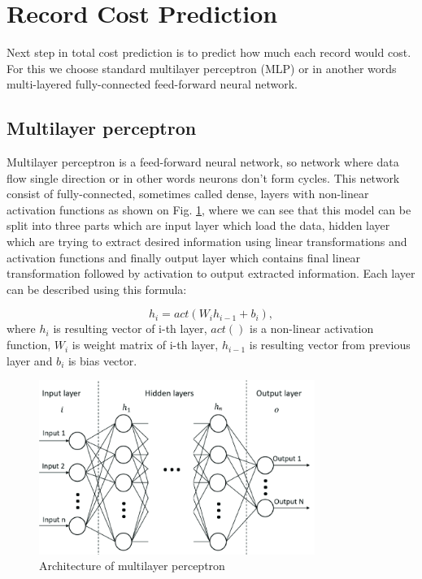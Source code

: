 
\section{Record Cost Prediction}
\label{recCostPred}

Next step in total cost prediction is to predict how much each record would cost. For this we choose standard multilayer perceptron (MLP) or in another words multi-layered fully-connected feed-forward neural network. 

\subsection{Multilayer perceptron}
\label{MLP}

Multilayer perceptron is a feed-forward neural network, so network where data flow single direction or in other words neurons don't form cycles. This network consist of fully-connected, sometimes called dense, layers with non-linear activation functions as shown on Fig. \ref{fig:mlp}, where we can see that this model can be split into three parts which are input layer which load the data, hidden layer which are trying to extract desired information using linear transformations and activation functions and finally output layer which contains final linear transformation followed by activation to output extracted information. Each layer can be described using this formula:

\begin{equation}
	\label{eqn:mlp}
	h_i = act(W_i h_{i-1} + b_i),
\end{equation}
where $h_i$ is resulting vector of i-th layer, $act()$ is a non-linear activation function, $W_i$ is weight matrix of i-th layer, $h_{i-1}$ is resulting vector from previous layer and $b_i$ is bias vector.

\begin{figure}[!h]
	\centering
	
	\includegraphics[width=0.8\textwidth]{images/MLP_arch.png}
	
	\caption{Architecture of multilayer perceptron \cite{MLParch}}
	\label{fig:mlp}
\end{figure} 